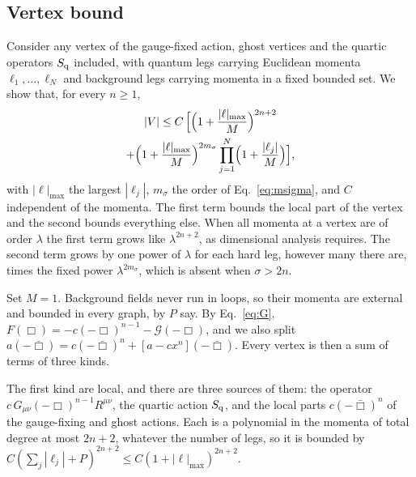 \documentclass[aps,prd,10pt,twocolumn,superscriptaddress,nofootinbib,floatfix,longbibliography]{revtex4-2}
\begin{document}
\subsection{Vertex bound}
\label{sec:vertex}

Consider any vertex of the gauge-fixed action, ghost vertices and the quartic operators $S_{\rm q}$ included, with quantum legs carrying Euclidean momenta $\ell_1,\dots,\ell_N$ and background legs carrying momenta in a fixed bounded set. We show that, for every $n\ge1$,
\begin{multline}
\label{eq:vertexbound}
|V|\le C\,\Bigl[\Bigl(1+\frac{|\ell|_{\max}}{M}\Bigr)^{2n+2}\\
+\Bigl(1+\frac{|\ell|_{\max}}{M}\Bigr)^{2m_\sigma}\prod_{j=1}^N\Bigl(1+\frac{|\ell_j|}{M}\Bigr)\Bigr],
\end{multline}
with $|\ell|_{\max}$ the largest $|\ell_j|$, $m_\sigma$ the order of Eq.~\eqref{eq:msigma}, and $C$ independent of the momenta. The first term bounds the local part of the vertex and the second bounds everything else. When all momenta at a vertex are of order $\lambda$ the first term grows like $\lambda^{2n+2}$, as dimensional analysis requires. The second term grows by one power of $\lambda$ for each hard leg, however many there are, times the fixed power $\lambda^{2m_\sigma}$, which is absent when $\sigma>2n$.

Set $M=1$. Background fields never run in loops, so their momenta are external and bounded in every graph, by $P$ say. By Eq.~\eqref{eq:G}, $F(\Box)=-c(-\Box)^{n-1}-\mathcal G(-\Box)$, and we also split $a(-\bar\Box)=c(-\bar\Box)^n+[a-cx^n](-\bar\Box)$. Every vertex is then a sum of terms of three kinds.

The first kind are local, and there are three sources of them: the operator $c\,G_{\mu\nu}(-\Box)^{n-1}R^{\mu\nu}$, the quartic action $S_{\rm q}$, and the local parts $c(-\bar\Box)^n$ of the gauge-fixing and ghost actions. Each is a polynomial in the momenta of total degree at most $2n+2$, whatever the number of legs, so it is bounded by $C(\sum_j|\ell_j|+P)^{2n+2}\le C(1+|\ell|_{\max})^{2n+2}$.
\end{document}
